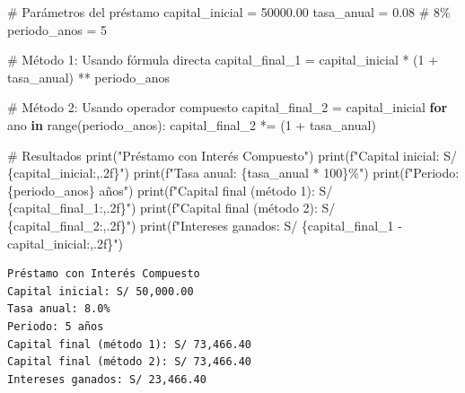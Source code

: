 \documentclass[
  doc,
  floatsintext,
  longtable,
  a4paper,
  nolmodern,
  notxfonts,
  notimes,
  12pt,
  colorlinks=true,linkcolor=blue,citecolor=blue,urlcolor=blue]{apa7}
\newenvironment{Shaded}{\begin{snugshade}}{\end{snugshade}}
\newcommand{\BuiltInTok}[1]{\textcolor[rgb]{0.00,0.23,0.31}{#1}}
\newcommand{\CommentTok}[1]{\textcolor[rgb]{0.37,0.37,0.37}{#1}}
\newcommand{\ControlFlowTok}[1]{\textcolor[rgb]{0.00,0.23,0.31}{\textbf{#1}}}
\newcommand{\DecValTok}[1]{\textcolor[rgb]{0.68,0.00,0.00}{#1}}
\newcommand{\FloatTok}[1]{\textcolor[rgb]{0.68,0.00,0.00}{#1}}
\newcommand{\KeywordTok}[1]{\textcolor[rgb]{0.00,0.23,0.31}{\textbf{#1}}}
\newcommand{\NormalTok}[1]{\textcolor[rgb]{0.00,0.23,0.31}{#1}}
\newcommand{\OperatorTok}[1]{\textcolor[rgb]{0.37,0.37,0.37}{#1}}
\newcommand{\SpecialCharTok}[1]{\textcolor[rgb]{0.37,0.37,0.37}{#1}}
\newcommand{\SpecialStringTok}[1]{\textcolor[rgb]{0.13,0.47,0.30}{#1}}
\newcommand{\StringTok}[1]{\textcolor[rgb]{0.13,0.47,0.30}{#1}}
\begin{document}
\begin{Shaded}
\begin{Highlighting}[]
\CommentTok{\# Parámetros del préstamo}
\NormalTok{capital\_inicial }\OperatorTok{=} \FloatTok{50000.00}
\NormalTok{tasa\_anual }\OperatorTok{=} \FloatTok{0.08}  \CommentTok{\# 8\%}
\NormalTok{periodo\_anos }\OperatorTok{=} \DecValTok{5}

\CommentTok{\# Método 1: Usando fórmula directa}
\NormalTok{capital\_final\_1 }\OperatorTok{=}\NormalTok{ capital\_inicial }\OperatorTok{*}\NormalTok{ (}\DecValTok{1} \OperatorTok{+}\NormalTok{ tasa\_anual) }\OperatorTok{**}\NormalTok{ periodo\_anos}

\CommentTok{\# Método 2: Usando operador compuesto}
\NormalTok{capital\_final\_2 }\OperatorTok{=}\NormalTok{ capital\_inicial}
\ControlFlowTok{for}\NormalTok{ ano }\KeywordTok{in} \BuiltInTok{range}\NormalTok{(periodo\_anos):}
\NormalTok{    capital\_final\_2 }\OperatorTok{*=}\NormalTok{ (}\DecValTok{1} \OperatorTok{+}\NormalTok{ tasa\_anual)}

\CommentTok{\# Resultados}
\BuiltInTok{print}\NormalTok{(}\StringTok{"Préstamo con Interés Compuesto"}\NormalTok{)}
\BuiltInTok{print}\NormalTok{(}\SpecialStringTok{f"Capital inicial: S/ }\SpecialCharTok{\{}\NormalTok{capital\_inicial}\SpecialCharTok{:,.2f\}}\SpecialStringTok{"}\NormalTok{)}
\BuiltInTok{print}\NormalTok{(}\SpecialStringTok{f"Tasa anual: }\SpecialCharTok{\{}\NormalTok{tasa\_anual }\OperatorTok{*} \DecValTok{100}\SpecialCharTok{\}}\SpecialStringTok{\%"}\NormalTok{)}
\BuiltInTok{print}\NormalTok{(}\SpecialStringTok{f"Periodo: }\SpecialCharTok{\{}\NormalTok{periodo\_anos}\SpecialCharTok{\}}\SpecialStringTok{ años"}\NormalTok{)}
\BuiltInTok{print}\NormalTok{(}\SpecialStringTok{f"Capital final (método 1): S/ }\SpecialCharTok{\{}\NormalTok{capital\_final\_1}\SpecialCharTok{:,.2f\}}\SpecialStringTok{"}\NormalTok{)}
\BuiltInTok{print}\NormalTok{(}\SpecialStringTok{f"Capital final (método 2): S/ }\SpecialCharTok{\{}\NormalTok{capital\_final\_2}\SpecialCharTok{:,.2f\}}\SpecialStringTok{"}\NormalTok{)}
\BuiltInTok{print}\NormalTok{(}\SpecialStringTok{f"Intereses ganados: S/ }\SpecialCharTok{\{}\NormalTok{capital\_final\_1 }\OperatorTok{{-}}\NormalTok{ capital\_inicial}\SpecialCharTok{:,.2f\}}\SpecialStringTok{"}\NormalTok{)}
\end{Highlighting}
\end{Shaded}

\begin{verbatim}
Préstamo con Interés Compuesto
Capital inicial: S/ 50,000.00
Tasa anual: 8.0%
Periodo: 5 años
Capital final (método 1): S/ 73,466.40
Capital final (método 2): S/ 73,466.40
Intereses ganados: S/ 23,466.40
\end{verbatim}
\end{document}
